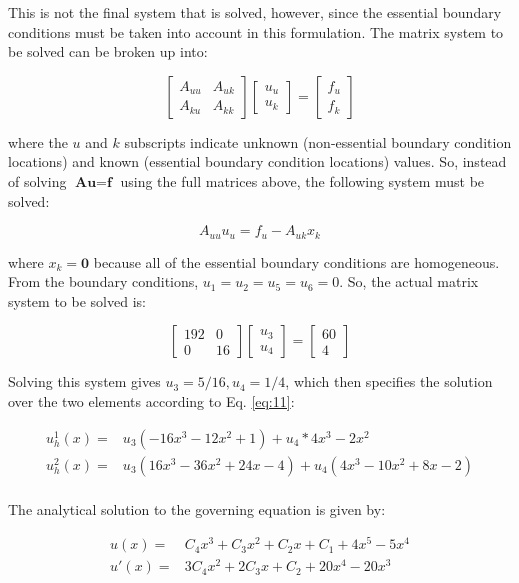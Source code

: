 \documentclass[10pt]{article}
\newcommand{\beq}{\begin{equation}}
\newcommand{\eeq}{\end{equation}}
\newcommand{\beqa}{\begin{equation}\begin{aligned}}
\newcommand{\eeqa}{\end{aligned}\end{equation}}
\begin{document}
This is not the final system that is solved, however, since the essential boundary conditions must be taken into account in this formulation. The matrix system to be solved can be broken up into:

\beq
\begin{bmatrix}
A_{uu} & A_{uk}\\
A_{ku} & A_{kk}
\end{bmatrix}
\begin{bmatrix}
u_u \\ u_k
\end{bmatrix} =
\begin{bmatrix}
f_u \\ f_k
\end{bmatrix}
\eeq

where the \(u\) and \(k\) subscripts indicate unknown (non-essential boundary condition locations) and known (essential boundary condition locations) values. So, instead of solving \(\textbf{A}\textbf{u}=\textbf{f}\) using the full matrices above, the following system must be solved:

\beq
A_{uu}u_u=f_u-A_{uk}x_k
\eeq

where \(x_k=\textbf{0}\) because all of the essential boundary conditions are homogeneous. From the boundary conditions, \(u_1=u_2=u_5=u_6=0\). So, the actual matrix system to be solved is:

\beq
\begin{bmatrix} 192 & 0\\
0 & 16
\end{bmatrix}
\begin{bmatrix} u_3\\u_4
\end{bmatrix}
=\begin{bmatrix} 60\\ 4\end{bmatrix}
\eeq

Solving this system gives \(u_3=5/16, u_4=1/4\), which then specifies the solution over the two elements according to Eq. \eqref{eq:11}:

\beqa
u_h^1(x)=& u_3(-16x^3-12x^2+1)+u_4*4x^3-2x^2\\
u_h^2(x)=& u_3(16x^3-36x^2+24x-4)+u_4(4x^3-10x^2+8x-2)\\
\eeqa

The analytical solution to the governing equation is given by:

\beqa
u(x)=&C_4x^3+C_3x^2+C_2x+C_1+4x^5-5x^4\\
u'(x)=&3C_4x^2+2C_3x+C_2+20x^4-20x^3\\
\eeqa
\end{document}
